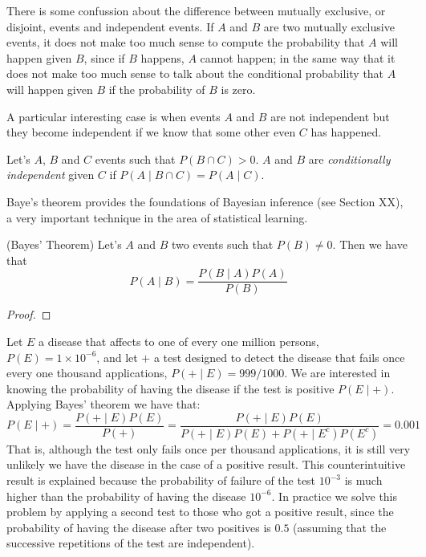 There is some confussion about the difference between mutually exclusive, or disjoint, events and independent events. If $A$ and $B$ are two mutually exclusive events, it does not make too much sense to compute the probability that $A$ will happen given $B$, since if $B$ happens, $A$ cannot happen; in the same way that it does not make too much sense to talk about the conditional probability that $A$ will happen given $B$ if the probability of $B$ is zero.

A particular interesting case is when events $A$ and $B$ are not independent but they become independent if we know that some other even $C$ has happened. 

\begin{definition}
Let's $A$, $B$ and $C$ events such that $P\left( B \cap C \right)>0$. $A$ and $B$ are \emph{conditionally independent} given $C$ if $P\left(A \mid B \cap C \right) = P\left( A \mid C \right)$.
\end{definition}

Baye's theorem provides the foundations of Bayesian inference (see Section {\color{red} XX}), a very important technique in the area of statistical learning.

\begin{theorem} (Bayes' Theorem) Let's $A$ and $B$ two events such that $P\left( B \right) \neq 0$. Then we have that
\[
P \left( A \mid B \right) = \frac{P \left( B \mid A \right) P \left( A \right)}{P \left( B \right)}
\]
\end{theorem}
\begin{proof}
\end{proof}

\begin{example}
Let $E$ a disease that affects to one of every one million persons, $P(E) = 1 \times 10^{-6}$, and let $+$ a test designed to detect the disease that fails once every one thousand applications, $P(+ \mid E) = 999/1000$. We are interested in knowing the probability of having the disease if the test is positive $P(E \mid +)$. Applying Bayes' theorem we have that:
\[
P(E \mid +) = \frac{P(+ \mid E) P(E)}{P(+)} = \frac{P(+ \mid E) P(E)}{P(+ \mid E) P(E) + P(+ \mid E^c) P(E^c)} = 0.001
\]
That is, although the test only fails once per thousand applications, it is still very unlikely we have the disease in the case of a positive result. This counterintuitive result is explained because the probability of failure of the test $10^{-3}$ is much higher than the probability of having the disease $10^{-6}$. In practice we solve this problem by applying a second test to those who got a positive result, since the probability of having the disease after two positives is $0.5$ (assuming that the successive repetitions of the test are independent).
\end{example}

